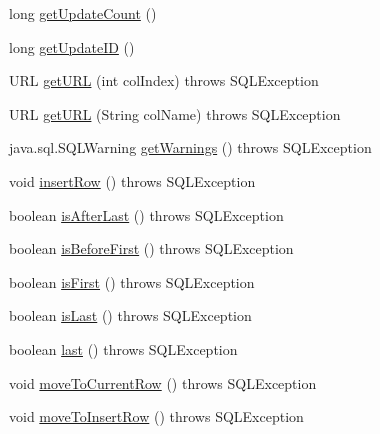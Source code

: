 \begin{DoxyCompactItemize}
\item 
long \mbox{\hyperlink{classcom_1_1mysql_1_1jdbc_1_1_result_set_impl_a7684c3389d3860adfc608fdcb8a0d40d}{get\+Update\+Count}} ()
\item 
long \mbox{\hyperlink{classcom_1_1mysql_1_1jdbc_1_1_result_set_impl_a8dc70e234b2271c66c1e5b239b252b13}{get\+Update\+ID}} ()
\item 
U\+RL \mbox{\hyperlink{classcom_1_1mysql_1_1jdbc_1_1_result_set_impl_a71ffe1e2049d4670597626e4dd6c7a63}{get\+U\+RL}} (int col\+Index)  throws S\+Q\+L\+Exception 
\item 
U\+RL \mbox{\hyperlink{classcom_1_1mysql_1_1jdbc_1_1_result_set_impl_acbd852b20d25a94e3c4ba7b9612c65ed}{get\+U\+RL}} (String col\+Name)  throws S\+Q\+L\+Exception 
\item 
java.\+sql.\+S\+Q\+L\+Warning \mbox{\hyperlink{classcom_1_1mysql_1_1jdbc_1_1_result_set_impl_a1f40b1109e74ab3c59104273b350d8e2}{get\+Warnings}} ()  throws S\+Q\+L\+Exception 
\item 
void \mbox{\hyperlink{classcom_1_1mysql_1_1jdbc_1_1_result_set_impl_a78e304e3279cbcf60392f18c1385e3bf}{insert\+Row}} ()  throws S\+Q\+L\+Exception 
\item 
boolean \mbox{\hyperlink{classcom_1_1mysql_1_1jdbc_1_1_result_set_impl_aad87b9e19492ef903b73d29a98b32e7e}{is\+After\+Last}} ()  throws S\+Q\+L\+Exception 
\item 
boolean \mbox{\hyperlink{classcom_1_1mysql_1_1jdbc_1_1_result_set_impl_a4bcb82a7e4b69b3662d741862ccca1e6}{is\+Before\+First}} ()  throws S\+Q\+L\+Exception 
\item 
boolean \mbox{\hyperlink{classcom_1_1mysql_1_1jdbc_1_1_result_set_impl_aca7c9fb309227d5c865643946ea0da46}{is\+First}} ()  throws S\+Q\+L\+Exception 
\item 
boolean \mbox{\hyperlink{classcom_1_1mysql_1_1jdbc_1_1_result_set_impl_a2eda2389a04bce0a5b22f64bc7b80dab}{is\+Last}} ()  throws S\+Q\+L\+Exception 
\item 
boolean \mbox{\hyperlink{classcom_1_1mysql_1_1jdbc_1_1_result_set_impl_ab3e82ce2b3fcc531558c942e42f554c3}{last}} ()  throws S\+Q\+L\+Exception 
\item 
void \mbox{\hyperlink{classcom_1_1mysql_1_1jdbc_1_1_result_set_impl_a942943874d58ef0a8a1ba42469448d27}{move\+To\+Current\+Row}} ()  throws S\+Q\+L\+Exception 
\item 
void \mbox{\hyperlink{classcom_1_1mysql_1_1jdbc_1_1_result_set_impl_a07626e75359cfe19d8905915f51807ab}{move\+To\+Insert\+Row}} ()  throws S\+Q\+L\+Exception 
\item 

\end{DoxyCompactItemize}
